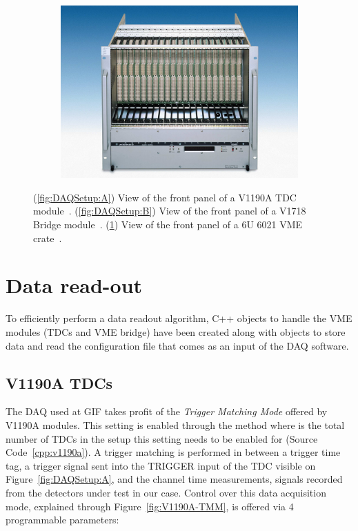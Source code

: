 \begin{figure}[H]
\begin{subfigure}{0.65\linewidth}
			\includegraphics[width = \plotwidth]{fig/app1/Wiener-front.png}
			\caption{\label{fig:DAQSetup:C}}
		\end{subfigure}
		\caption{\label{fig:DAQSetup} (\ref{fig:DAQSetup:A}) View of the front panel of a V1190A TDC module~\cite{V1190AMUT}. (\ref{fig:DAQSetup:B}) View of the front panel of a V1718 Bridge module~\cite{V1718MUT}. (\ref{fig:DAQSetup:C}) View of the front panel of a 6U 6021 VME crate~\cite{6U6000MUT}.}
	\end{figure}

\section{Data read-out}
\label{app1:sec:Data}

	To efficiently perform a data readout algorithm, C++ objects to handle the VME modules (TDCs and VME bridge) have been created along with objects to store data and read the configuration file that comes as an input of the DAQ software.\\

    \subsection{V1190A TDCs}
    \label{app1:ssec:V1190A}

	The DAQ used at GIF takes profit of the \textit{Trigger Matching Mode} offered by V1190A modules. This setting is enabled through the method  where  is the total number of TDCs in the setup this setting needs to be enabled for (Source Code~\ref{cpp:v1190a}). A trigger matching is performed in between a trigger time tag, a trigger signal sent into the TRIGGER input of the TDC visible on Figure~\ref{fig:DAQSetup:A}, and the channel time measurements, signals recorded from the detectors under test in our case. Control over this data acquisition mode, explained through Figure~\ref{fig:V1190A-TMM}, is offered via 4 programmable parameters:
        
